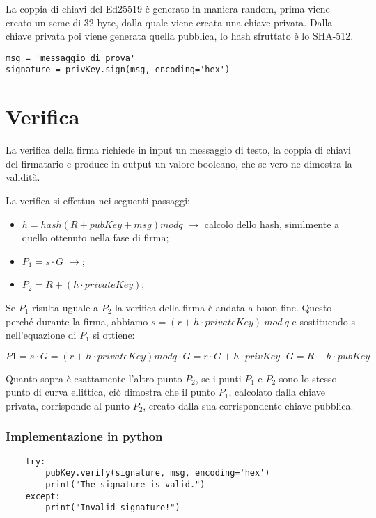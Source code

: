 La coppia di chiavi del Ed25519 è generato in maniera random, prima viene creato un seme di 32 byte, dalla quale viene creata una chiave privata. Dalla chiave privata poi viene generata quella pubblica, lo hash sfruttato è lo SHA-512.

\begin{lstlisting}
msg = 'messaggio di prova'
signature = privKey.sign(msg, encoding='hex')
\end{lstlisting}

\section{Verifica}

La verifica della firma richiede in input un messaggio di testo, la coppia di chiavi del firmatario e produce in output un valore booleano, che se vero ne dimostra la validità. 

La verifica si effettua nei seguenti passaggi:

\begin{itemize}
	\item $h = hash(R + pubKey + msg) mod q$ $\rightarrow$ calcolo dello hash, similmente a quello ottenuto nella fase di firma;
	\item $P_1 = s \cdot G$ $\rightarrow$;
	\item $P_2 = R + (h \cdot privateKey)$;
\end{itemize}

Se $P_1$ risulta uguale a $P_2$ la verifica della firma è andata a buon fine.
Questo perché durante la firma, abbiamo $s = (r + h \cdot privateKey) \: mod \: q$ e sostituendo s nell'equazione di $P_1$ si ottiene:
\begin{center}
	$P1 = s \cdot G = (r + h \cdot privateKey) mod q \cdot G = r \cdot G + h \cdot privKey \cdot G = R + h \cdot pubKey$
\end{center}

Quanto sopra è esattamente l'altro punto $P_2$, se i punti $P_1$ e $P_2$ sono lo stesso punto di curva ellittica, ciò dimostra che il punto $P_1$, calcolato dalla chiave privata, corrisponde al punto $P_2$, creato dalla sua corrispondente chiave pubblica.

\subsubsection{Implementazione in python}

\begin{lstlisting}
	try:
		pubKey.verify(signature, msg, encoding='hex')
		print("The signature is valid.")
	except:
		print("Invalid signature!")
\end{lstlisting}